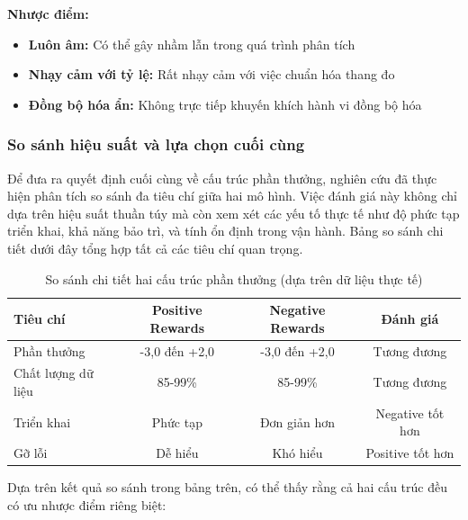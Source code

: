 \textbf{Nhược điểm:}
\begin{itemize}
    \item \textbf{Luôn âm:} Có thể gây nhầm lẫn trong quá trình phân tích

    \item \textbf{Nhạy cảm với tỷ lệ:} Rất nhạy cảm với việc chuẩn hóa thang đo

    \item \textbf{Đồng bộ hóa ẩn:} Không trực tiếp khuyến khích
        hành vi đồng bộ hóa
\end{itemize}

\subsubsection{So sánh hiệu suất và lựa chọn cuối cùng}
Để đưa ra quyết định cuối cùng về cấu trúc phần thưởng, nghiên cứu đã thực hiện phân tích so sánh đa tiêu chí giữa hai mô hình. Việc đánh giá này không chỉ dựa trên hiệu suất thuần túy mà còn xem xét các yếu tố thực tế như độ phức tạp triển khai, khả năng bảo trì, và tính ổn định trong vận hành. Bảng so sánh chi tiết dưới đây tổng hợp tất cả các tiêu chí quan trọng.

\begin{table}[!htp]
    \centering
    \caption{So sánh chi tiết hai cấu trúc phần thưởng (dựa trên dữ liệu thực tế)}
    \label{tab:reward_structure_comparison}
    \begin{tabular}{@{}lccc@{}}
        \toprule \textbf{Tiêu chí}  & \textbf{Positive Rewards} & \textbf{Negative Rewards} & \textbf{Đánh giá}    \\
        \midrule Phần thưởng                & -3,0 đến +2,0             & -3,0 đến +2,0             & Tương đương          \\
        Chất lượng dữ liệu                & 85-99\%                   & 85-99\%                   & Tương đương          \\
        Triển khai              & Phức tạp                  & Đơn giản hơn              & Negative tốt hơn     \\
        Gỡ lỗi                   & Dễ hiểu                   & Khó hiểu                  & Positive tốt hơn     \\
        \bottomrule
    \end{tabular}
\end{table}

Dựa trên kết quả so sánh trong bảng trên, có thể thấy rằng cả hai cấu trúc đều có ưu nhược điểm riêng biệt:

